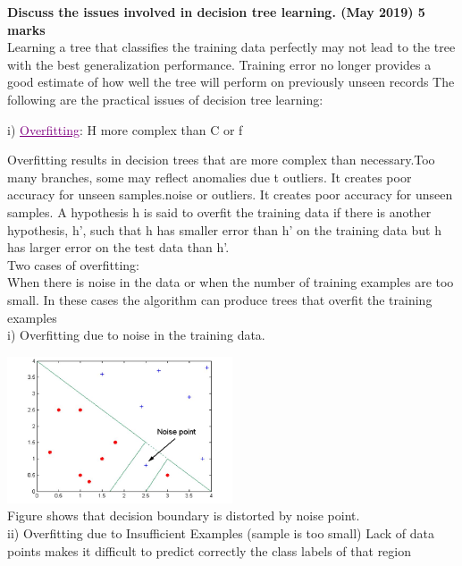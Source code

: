 
\textbf{\textcolor{LightMagenta}{Discuss the issues involved in decision tree learning. (May 2019) \hfill 5 marks}}
\\[5pt]

Learning a tree that classifies the training data perfectly may not lead to the tree with the best generalization performance. Training error no longer  provides  a good estimate of how  well the tree will perform on previously  unseen  records  The following are the practical issues of decision tree learning:

i)	\textcolor{purple}{\underline{Overfitting}}: H more complex than C or f

 Overfitting results in	decision trees that	are more	complex	than necessary.Too many branches, some may reflect anomalies due t outliers. It creates poor accuracy for unseen samples.noise or outliers. It creates poor accuracy for unseen samples.
 A hypothesis h is said to overfit the training data if	there is another hypothesis, h’, such that h has smaller error than h’ on the training data but h has larger error on the test data than h’.\\
 
\textcolor{ReddishRose}{Two cases of overfitting:}\\
When there is noise in the data or when the number of training examples are too small. In these cases the algorithm can produce trees that overﬁt the training examples\\
 
i)	Overfitting due to noise in the training data.

\graphicspath{ {./} }
\includegraphics[width=0.5\textwidth]{Images/A27_img1.png}\\


Figure shows that decision boundary is distorted by noise point.\\
ii)	Overfitting due to Insufficient Examples (sample is too small)
Lack of data points  makes it difficult to predict correctly the class labels of  that region
 
